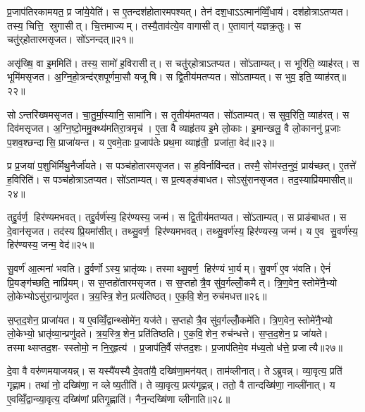 प्र॒जाप॑तिरकामयत॒ प्र जा॑ये॒येति॑। स ए॒तन्दश॑होतारमपश्यत्। तेन॑ दश॒धाऽऽत्मान॑व्विँ॒धाय॑। दश॑होत्राऽतप्यत। तस्य॒ चित्ति॒ स्रुगासीत्। चि॒त्तमाज्यम्। तस्यै॒ताव॑त्ये॒व वागासीत्। ए॒तावान्॑ यज्ञक्र॒तुः। स चतु॑र्‌होतारमसृजत। सो॑ऽनन्दत्॥२१॥

असृ॑ख्षि॒ वा इ॒ममिति॑। तस्य॒ सामो॑ ह॒विरासीत्। स चतु॑र्‌होत्राऽतप्यत। सो॑ऽताम्यत्। स भूरिति॒ व्याह॑रत्। स भूमि॑मसृजत। अ॒ग्नि॒हो॒त्रन्द॑र्‌शपूर्णमा॒सौ यजूषि। स द्वि॒तीय॑मतप्यत। सो॑ऽताम्यत्। स भुव॒ इति॒ व्याह॑रत्॥२२॥

सोऽन्तरि॑ख्षमसृजत। चा॒तु॒र्मा॒स्यानि॒ सामा॑नि। स तृ॒तीय॑मतप्यत। सो॑ऽताम्यत्। स सुव॒रिति॒ व्याह॑रत्। स दिव॑मसृजत। अ॒ग्नि॒ष्टो॒ममु॒क्थ्य॑मतिरा॒त्रमृच॑। ए॒ता वै व्याहृ॑तय इ॒मे लो॒काः। इ॒मान्खलु॒ वै लो॒काननु॑ प्र॒जाः प॒शव॒श्छन्दासि॒ प्राजा॑यन्त। य ए॒वमे॒ताः प्र॒जाप॑तेः प्रथ॒मा व्याहृ॑ती॒ प्रजा॑ता॒ वेद॑॥२३॥

प्र प्र॒जया॑ प॒शुभि॑र्मिथु॒नैर्जा॑यते। स पञ्च॑होतारमसृजत। स ह॒विर्नावि॑न्दत। तस्मै॒ सोम॑स्त॒नुवं॒ प्राय॑च्छत्। ए॒तत्ते॑ ह॒विरिति॑। स पञ्च॑होत्राऽतप्यत। सो॑ऽताम्यत्। स प्र॒त्यङ्ङ॑बाधत। सोऽसु॑रानसृजत। तद॒स्याप्रि॑यमासीत्॥२४॥

तद्दु॒र्वर्ण॒ हिर॑ण्यमभवत्। तद्दु॒र्वर्ण॑स्य॒ हिर॑ण्यस्य॒ जन्म॑। स द्वि॒तीय॑मतप्यत। सो॑ऽताम्यत्। स प्राङ॑बाधत। स दे॒वान॑सृजत। तद॑स्य प्रि॒यमा॑सीत्। तथ्सु॒वर्ण॒ हिर॑ण्यमभवत्। तथ्सु॒वर्ण॑स्य॒ हिर॑ण्यस्य॒ जन्म॑। य ए॒व सु॒वर्ण॑स्य॒ हिर॑ण्यस्य॒ जन्म॒ वेद॑॥२५॥

सु॒वर्ण॑ आ॒त्मना॑ भवति। दु॒र्वर्णोऽस्य॒ भ्रातृ॑व्यः। तस्माथ्सु॒वर्ण॒ हिर॑ण्यं भा॒र्यम्। सु॒वर्ण॑ ए॒व भ॑वति। ऐनं॑ प्रि॒यङ्ग॑च्छति॒ नाप्रि॑यम्। स स॒प्तहो॑तारमसृजत। स स॒प्तहोत्रै॒व सु॑व॒र्गल्लोँ॒कमैत्। त्रि॒ण॒वेन॒ स्तोमे॑नै॒भ्यो लो॒केभ्योऽसु॑रा॒न्प्राणु॑दत। त्र॒य॒स्त्रि॒शेन॒ प्रत्य॑तिष्ठत्। ए॒क॒वि॒शेन॒ रुच॑मधत्त॥२६॥

स॒प्त॒द॒शेन॒ प्राजा॑यत। य ए॒वव्विँ॒द्वान्थ्सोमे॑न॒ यज॑ते। स॒प्तहोत्रै॒व सु॑व॒र्गल्लोँ॒कमे॑ति। त्रि॒ण॒वेन॒ स्तोमे॑नै॒भ्यो लो॒केभ्यो॒ भ्रातृ॑व्या॒न्प्रणु॑दते। त्र॒य॒स्त्रि॒शेन॒ प्रति॑तिष्ठति। ए॒क॒वि॒शेन॒ रुच॑न्धत्ते। स॒प्त॒द॒शेन॒ प्र जा॑यते। तस्माथ्सप्तद॒श- स्स्तोमो॒ न नि॒र्॒हृत्य॑। प्र॒जाप॑ति॒र्वै स॑प्तद॒शः। प्र॒जाप॑तिमे॒व म॑ध्य॒तो ध॑त्ते॒ प्रजात्यै॥२७॥\anuvakamend[अ॒न॒न्द॒द्भुव॒ इति॒ व्याह॑र॒द्वेदा॑सी॒द्वेदा॑धत्त॒ प्रजात्यै]

दे॒वा वै वरु॑णमयाजयन्न्। स यस्यै॑यस्यै दे॒वता॑यै॒ दख्षि॑णा॒मन॑यत्। ताम॑व्लीनात्। तेऽब्रुवन्न्। व्या॒वृत्य॒ प्रति॑ गृह्णाम। तथा॑ नो॒ दख्षि॑णा॒ न व्लेष्य॒तीति॑। ते व्या॒वृत्य॒ प्रत्य॑गृह्णन्न्। ततो॒ वै तान्दख्षि॑णा॒ नाव्ली॑नात्। य ए॒वव्विँ॒द्वान्व्या॒वृत्य॒ दख्षि॑णां प्रतिगृ॒ह्णाति॑। नैन॒न्दख्षि॑णा व्लीनाति॥२८॥

